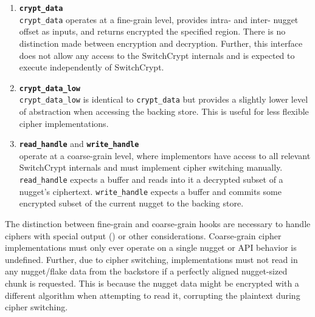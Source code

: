 \begin{enumerate}
   \item \textbf{\texttt{crypt\_data}}\\\texttt{crypt\_data}
   operates at a fine-grain level, provides intra- and inter- nugget offset as
    inputs, and returns encrypted the specified region. There is no distinction
    made between encryption and decryption. Further, this interface does not
    allow any access to the SwitchCrypt internals and is expected to execute
    independently of SwitchCrypt. 

   \item \textbf{\texttt{crypt\_data\_low}}\\\texttt{crypt\_data\_low}
   is identical to \texttt{crypt\_data} but provides a slightly lower level of
   abstraction when accessing the backing store. This is useful for less
   flexible cipher implementations.

   \item \textbf{\texttt{read\_handle}} and \textbf{\texttt{write\_handle}}\\
   operate at a coarse-grain level, where implementors have access to all
   relevant SwitchCrypt internals and must implement cipher switching manually.
   \texttt{read\_handle} expects a buffer and reads into it a decrypted subset
   of a nugget's ciphertext. \texttt{write\_handle} expects a buffer
   and commits some encrypted subset of the current nugget to the backing store.
\end{enumerate}

The distinction between fine-grain and coarse-grain hooks are necessary to
handle ciphers with special output () or other considerations. Coarse-grain cipher
implementations must only ever operate on a single nugget or API behavior is
undefined. Further, due to cipher switching, implementations must not read in
any nugget/flake data from the backstore if a perfectly aligned nugget-sized
chunk is requested. This is because the nugget data might be encrypted with a
different algorithm when attempting to read it, corrupting the plaintext during
cipher switching.


